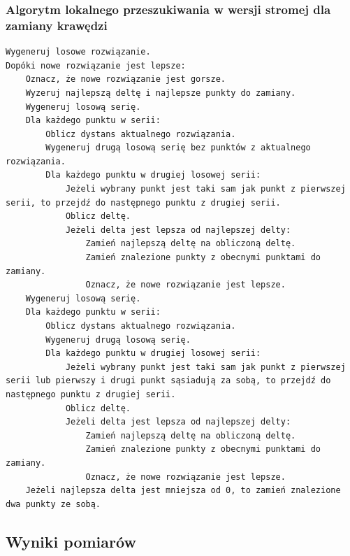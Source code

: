 \documentclass[a4paper]{article}
\begin{document}
\subsubsection{Algorytm lokalnego przeszukiwania w wersji stromej dla zamiany krawędzi}

\begin{lstlisting}
Wygeneruj losowe rozwiązanie.
Dopóki nowe rozwiązanie jest lepsze:
    Oznacz, że nowe rozwiązanie jest gorsze.
    Wyzeruj najlepszą deltę i najlepsze punkty do zamiany.
    Wygeneruj losową serię.
    Dla każdego punktu w serii:
        Oblicz dystans aktualnego rozwiązania.
        Wygeneruj drugą losową serię bez punktów z aktualnego rozwiązania.
        Dla każdego punktu w drugiej losowej serii:
            Jeżeli wybrany punkt jest taki sam jak punkt z pierwszej serii, to przejdź do następnego punktu z drugiej serii.
            Oblicz deltę.
            Jeżeli delta jest lepsza od najlepszej delty:
                Zamień najlepszą deltę na obliczoną deltę.
                Zamień znalezione punkty z obecnymi punktami do zamiany.
                Oznacz, że nowe rozwiązanie jest lepsze.
    Wygeneruj losową serię.
    Dla każdego punktu w serii:
        Oblicz dystans aktualnego rozwiązania.
        Wygeneruj drugą losową serię.
        Dla każdego punktu w drugiej losowej serii:
            Jeżeli wybrany punkt jest taki sam jak punkt z pierwszej serii lub pierwszy i drugi punkt sąsiadują za sobą, to przejdź do następnego punktu z drugiej serii.
            Oblicz deltę.
            Jeżeli delta jest lepsza od najlepszej delty:
                Zamień najlepszą deltę na obliczoną deltę.
                Zamień znalezione punkty z obecnymi punktami do zamiany.
                Oznacz, że nowe rozwiązanie jest lepsze.
    Jeżeli najlepsza delta jest mniejsza od 0, to zamień znalezione dwa punkty ze sobą.
\end{lstlisting}

\subsection{Wyniki pomiarów}
\end{document}
